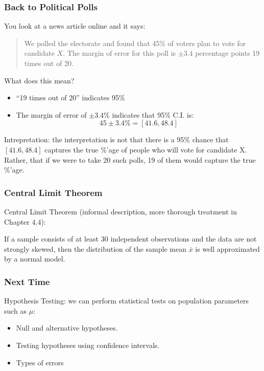 \documentclass[handout]{beamer}
\newcommand{\blue}[1]{\textcolor{blue2}{#1}}
\newcommand{\xbar}{\overline{x}}
\begin{document}
\begin{frame}
\frametitle{Back to Political Polls}
You look at a news article online and it says:
\begin{quotation}
\noindent We polled the electorate and found that 45\% of voters plan to vote for candidate $X$.  The margin of error for this poll is $\pm 3.4$ percentage points 19 times out of 20.  
\end{quotation}
What does this mean?
\begin{itemize}
\item ``19 times out of 20'' indicates 95\%
\item The margin of error of $\pm 3.4$\% indicates that 95\% C.I. is:
\[45 \pm 3.4 \% = [41.6, 48.4]\]
\end{itemize}
\pause \blue{Intrepretation}: the interpretation is not that there is a 95\% chance that $[41.6, 48.4]$ captures the true \%'age of people who will vote for candidate X.  Rather, that if we were to take 20 such polls, 19 of them would capture the true \%'age.
\end{frame}


\begin{frame}
\frametitle{Central Limit Theorem}

\pause \blue{Central Limit Theorem} (informal description, more thorough treatment in Chapter 4.4):\\

\vspace{0.5cm}

\pause If a sample consists of at least 30 independent observations and the data are not
strongly skewed, then the distribution of the sample mean $\xbar$ is well approximated by
a \blue{normal model}.


\end{frame}


\begin{frame}[fragile]
\frametitle{Next Time}

Hypothesis Testing:  we can perform \blue{statistical tests} on population parameters such as $\mu$:

\begin{itemize}
\item Null and alternative hypotheses.
\item Testing hypotheses using confidence intervals.
\item Types of errors
\end{itemize}


\end{frame}
\end{document}

